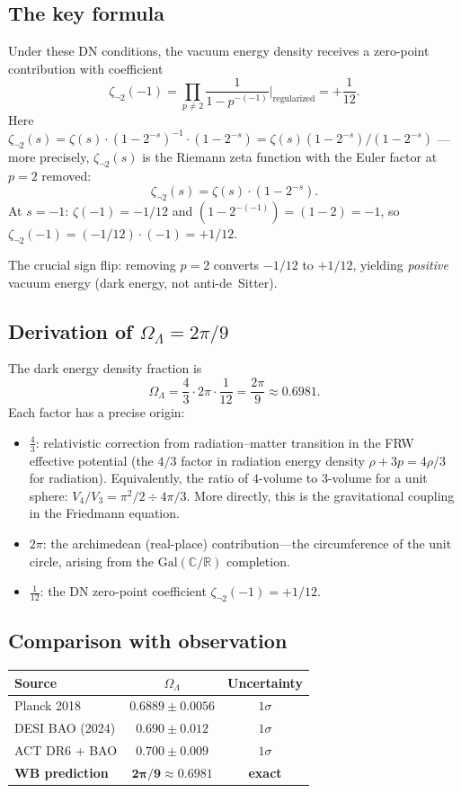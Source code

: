 \documentclass[12pt,a4paper]{article}
\theoremstyle{definition}
\newcommand{\Gal}{\mathrm{Gal}}
\newcommand{\R}{\mathbb{R}}
\newcommand{\C}{\mathbb{C}}
\newcommand{\OmL}{\Omega_\Lambda}
\newcommand{\zetanot}{\zeta_{\neg 2}}
\begin{document}
\subsection{The key formula}

Under these DN conditions, the vacuum energy density receives a zero-point
contribution with coefficient
\[
  \zetanot(-1) = \prod_{p\ne 2}\frac{1}{1-p^{-(-1)}}
  \bigg|_{\text{regularized}} = +\frac{1}{12}.
\]
Here $\zetanot(s)=\zeta(s)\cdot(1-2^{-s})^{-1}\cdot(1-2^{-s})=\zeta(s)(1-2^{-s})/(1-2^{-s})$
---more precisely, $\zetanot(s)$ is the Riemann zeta function with the Euler factor at $p=2$ removed:
\[
  \zetanot(s) = \zeta(s)\cdot(1-2^{-s}).
\]
At $s=-1$: $\zeta(-1)=-1/12$ and $(1-2^{-(-1)})=(1-2)=-1$, so
$\zetanot(-1)=(-1/12)\cdot(-1)=+1/12$.

The crucial sign flip: removing $p=2$ converts $-1/12$ to $+1/12$, yielding
\emph{positive} vacuum energy (dark energy, not anti-de~Sitter).

\subsection{Derivation of $\OmL=2\pi/9$}

The dark energy density fraction is
\[
  \boxed{\OmL = \frac{4}{3}\cdot 2\pi\cdot\frac{1}{12}=\frac{2\pi}{9}\approx 0.6981.}
\]
Each factor has a precise origin:
\begin{itemize}
\item $\frac{4}{3}$: relativistic correction from radiation--matter transition
  in the FRW effective potential (the $4/3$ factor in radiation energy density
  $\rho+3p=4\rho/3$ for radiation).  Equivalently, the ratio of
  $4$-volume to $3$-volume for a unit sphere: $V_4/V_3=\pi^2/2\div 4\pi/3$.
  More directly, this is the gravitational coupling in the Friedmann equation.
\item $2\pi$: the archimedean (real-place) contribution---the circumference
  of the unit circle, arising from the $\Gal(\C/\R)$ completion.
\item $\frac{1}{12}$: the DN zero-point coefficient $\zetanot(-1)=+1/12$.
\end{itemize}

\subsection{Comparison with observation}

\begin{center}
\begin{tabular}{lcc}
\toprule
\textbf{Source} & $\OmL$ & \textbf{Uncertainty} \\
\midrule
Planck 2018        & $0.6889\pm 0.0056$  & $1\sigma$ \\
DESI BAO (2024)    & $0.690\pm 0.012$    & $1\sigma$ \\
ACT DR6 + BAO      & $0.700\pm 0.009$    & $1\sigma$ \\
\textbf{WB prediction} & $\mathbf{2\pi/9\approx 0.6981}$ & \textbf{exact} \\
\bottomrule
\end{tabular}
\end{center}
\end{document}
